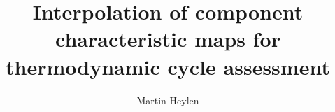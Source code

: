 \documentclass[12pt,a4paper]{report}
\title{Interpolation of component characteristic maps for thermodynamic cycle assessment}
\author{Martin Heylen}
\begin{document}
\makeatletter
\newenvironment{folding}{\endgroup}{\begingroup \def \@currenvir{folding}\edef \@currenvline{\on@line}}
\makeatother
\maketitle

\tableofcontents
\listoffigures
\listoftables
%


\newpage




\newpage

\newpage

\newpage

\newpage








\end{document}
